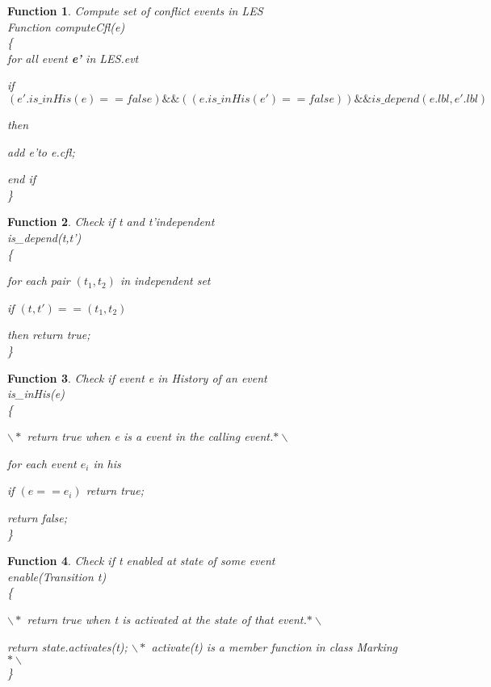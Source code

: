 \documentclass[11pt]{article}
\newtheorem{function}{Function}
\begin{document}
\begin{function}{Compute set of conflict events in LES}	\\ 
	Function computeCfl(e)\\
	\{\\
	  for all event \textbf{e'} in LES.evt
	  
	  	if $(e'.is\_inHis(e)==false)\&\& ((e.is\_inHis(e')==false)) \&\& is\_depend(e.lbl,e'.lbl)$ 
	  	
	  	then
	  	
	  		add e'to e.cfl;
	  		
	  	end if \\
	  \}
\end{function}	

\begin{function}{Check if t and t'independent} \\
	is\_depend(t,t')\\
	\{
	
		for each pair $(t_1,t_2)$ in independent set
		
		if $(t,t')==(t_1,t_2)$
		
		then return true;\\
	\}		
\end{function}

\begin{function}{Check if event e in History of an event}\\
	is\_inHis(e)\\
	\{
	
		$\backslash*$ return true when e is a event in the calling event.$*\backslash $
	
		for each event $e_i$ in his
	
		if $(e == e_i) $ return true;
	
		return false;\\
	\}	
\end{function}

\begin{function}{Check if t enabled at state of some event}\\
	enable(Transition t)\\
	\{

		$\backslash*$ return true when t is activated at the state of that event.$*\backslash $
	
		return state.activates(t); $\backslash*$ activate(t) is a member function in class Marking $*\backslash $ \\
	\}	
\end{function} 
						
\end{document}

